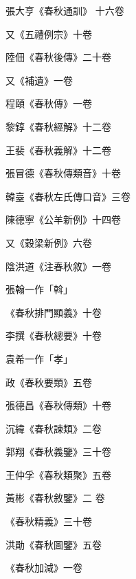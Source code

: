 \begin{pinyinscope}
 張大亨《春秋通訓》
 十六卷



 又《五禮例宗》十卷



 陸佃《春秋後傳》二十卷



 又《補遺》一卷



 程頤《春秋傳》一卷



 黎錞《春秋經解》十二卷



 王裴《春秋義解》十二卷



 張冒德《春秋傳類音》十卷



 韓臺《春秋左氏傳口音》三卷



 陳德寧《公羊新例》十四卷



 又《穀梁新例》六卷



 陰洪道《注春秋敘》一卷



 張翰一作「斡」



 《春秋排門顯義》十卷



 李撰《春秋總要》十卷



 袁希一作「孝」



 政《春秋要類》五卷



 張德昌《春秋傳類》十卷



 沉緯《春秋諫類》二卷



 郭翔《春秋義鑒》三十卷



 王仲孚《春秋類聚》五卷



 黃彬《春秋敘鑒》二
 卷



 《春秋精義》三十卷



 洪勛《春秋圖鑒》五卷



 《春秋加減》一卷




\end{pinyinscope}
